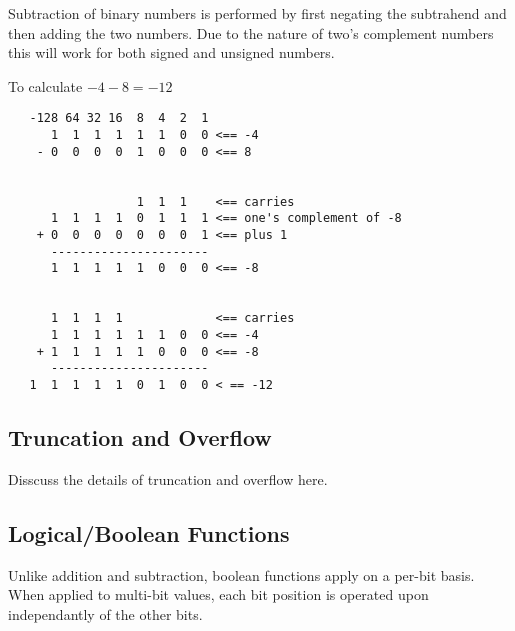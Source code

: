 Subtraction of binary numbers is performed by first negating
the subtrahend and then adding the two numbers.  Due to the
nature of two's complement numbers this will work for both 
signed and unsigned numbers.

To calculate $-4-8 = -12$

\begin{verbatim}
   -128 64 32 16  8  4  2  1
      1  1  1  1  1  1  0  0 <== -4
    - 0  0  0  0  1  0  0  0 <== 8


                  1  1  1    <== carries
      1  1  1  1  0  1  1  1 <== one's complement of -8
    + 0  0  0  0  0  0  0  1 <== plus 1
      ----------------------
      1  1  1  1  1  0  0  0 <== -8
      
	  
      1  1  1  1             <== carries
      1  1  1  1  1  1  0  0 <== -4
    + 1  1  1  1  1  0  0  0 <== -8
      ----------------------
   1  1  1  1  1  0  1  0  0 < == -12
\end{verbatim}


\subsection{Truncation and Overflow}

Disscuss the details of truncation and overflow here.

\subsection{Logical/Boolean Functions}

Unlike addition and subtraction, boolean functions apply 
on a per-bit basis.
When applied to multi-bit values, each bit position is operated upon 
independantly of the other bits.

